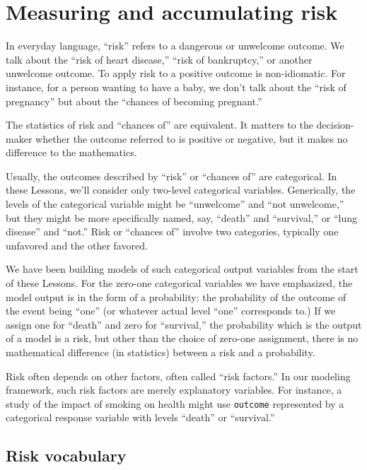\documentclass[
  letterpaper,
  DIV=11,
  numbers=noendperiod,
  oneside]{scrartcl}
\begin{document}
\newpage

\section{Measuring and accumulating risk}\label{sec-risk}

In everyday language, ``risk'' refers to a dangerous or unwelcome
outcome. We talk about the ``risk of heart disease,'' ``risk of
bankruptcy,'' or another unwelcome outcome. To apply risk to a positive
outcome is non-idiomatic. For instance, for a person wanting to have a
baby, we don't talk about the ``risk of pregnancy'' but about the
``chances of becoming pregnant.''

The statistics of risk and ``chances of'' are equivalent. It matters to
the decision-maker whether the outcome referred to is positive or
negative, but it makes no difference to the mathematics.

Usually, the outcomes described by ``risk'' or ``chances of'' are
categorical. In these Lessons, we'll consider only two-level categorical
variables. Generically, the levels of the categorical variable might be
``unwelcome'' and ``not unwelcome,'' but they might be more specifically
named, say, ``death'' and ``survival,'' or ``lung disease'' and ``not.''
Risk or ``chances of'' involve two categories, typically one unfavored
and the other favored.

We have been building models of such categorical output variables from
the start of these Lessons. For the zero-one categorical variables we
have emphasized, the model output is in the form of a probability: the
probability of the outcome of the event being ``one'' (or whatever
actual level ``one'' corresponds to.) If we assign one for ``death'' and
zero for ``survival,'' the probability which is the output of a model is
a risk, but other than the choice of zero-one assignment, there is no
mathematical difference (in statistics) between a risk and a
probability.

Risk often depends on other factors, often called ``risk factors.'' In
our modeling framework, such risk factors are merely explanatory
variables. For instance, a study of the impact of smoking on health
might use \texttt{outcome} represented by a categorical response
variable with levels ``death'' or ``survival.''

\subsection{Risk vocabulary}\label{risk-vocabulary}
\end{document}
